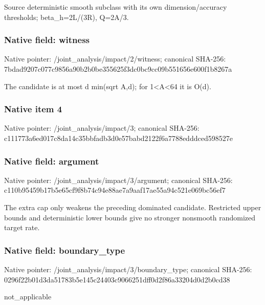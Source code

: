 \documentclass[10pt,a4paper]{article}
\begin{document}
\begingroup\raggedright\sloppy Source deterministic smooth subclass with its own dimension/\allowbreak{}accuracy thresholds;\allowbreak{} beta\_\allowbreak{}h=\allowbreak{}2L/\allowbreak{}(3R),\allowbreak{} Q=\allowbreak{}2A/\allowbreak{}3.\par\endgroup

\subsubsection{Native field: witness}
Native pointer: /joint\_\allowbreak{}analysis/impact/2/witness; canonical SHA-256: 7bdad9207c077c9856a90b2b0be355625f3dc0bc9cc09b551656e600f1b8267a

\begingroup\raggedright\sloppy The candidate is at most d min(sqrt A,\allowbreak{}d);\allowbreak{} for 1<A<64 it is O(d).\par\endgroup

\subsubsection{Native item 4}
Native pointer: /joint\_\allowbreak{}analysis/impact/3; canonical SHA-256: c111773a6ed017c8da14c35bbfadb3d0e57babd2122f6a7788edddced598527e

\subsubsection{Native field: argument}
Native pointer: /joint\_\allowbreak{}analysis/impact/3/argument; canonical SHA-256: c110b95459b17b5e65cf9f8b74c94e88ae7a9aaf17ae55a94c521e069bc56ef7

\begingroup\raggedright\sloppy The extra cap only weakens the preceding dominated candidate. Restricted upper bounds and deterministic lower bounds give no stronger nonsmooth randomized target rate.\par\endgroup

\subsubsection{Native field: boundary\_\allowbreak{}type}
Native pointer: /joint\_\allowbreak{}analysis/impact/3/boundary\_\allowbreak{}type; canonical SHA-256: 0296f22b01d3da51783b5e145c24403c9066251dff0d2f86a33204d0d2b0cd38

\begingroup\raggedright\sloppy not\_\allowbreak{}applicable\par\endgroup
\end{document}
